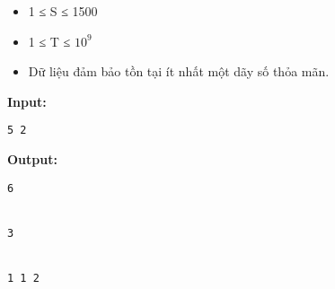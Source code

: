 \begin{itemize}
	\item     1 ≤ S ≤ 1500   
	\item     1 ≤ T ≤ $10^{9}$
	\item     Dữ liệu đảm bảo tồn tại ít nhất một dãy số thỏa mãn.   
\end{itemize}
\textbf{    Input:   }
\begin{verbatim}
5 2\end{verbatim}

\textbf{    Output:   }
\begin{verbatim}
6


3


1 1 2 


\end{verbatim}